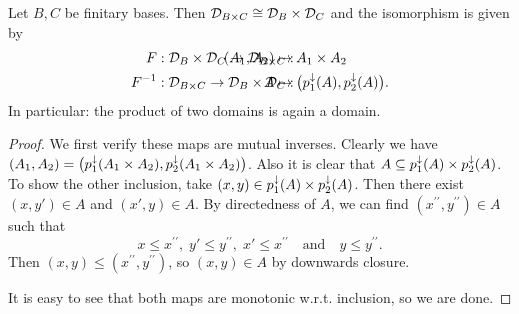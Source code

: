 \begin{lemma} \label{domainProductLemma}
Let $B,C$ be finitary bases. Then $\mathcal{D}_{B\times C} \cong \mathcal{D}_B\times\mathcal{D}_C$ and the isomorphism is given by
\begin{align*}
F&: \domain_B\times\domain_C \to \domain_{B\times C}: & \hspace{-6em} (A_1,A_2) &\mapsto A_1\times A_2 \\
F^{-1}&: \domain_{B\times C} \to \domain_B\times\domain_C: & \hspace{-6em} A&\mapsto \big(p_1^\imf(A), p_2^\imf(A)\big).
\end{align*}
In particular: the product of two domains is again a domain.
\end{lemma}
\begin{proof}
We first verify these maps are mutual inverses. Clearly we have $(A_1, A_2) = \big(p_1^\downarrow(A_1\times A_2), p_2^\downarrow(A_1\times A_2)\big)$. Also it is clear that $A \subseteq p_1^\downarrow(A)\times p_2^\downarrow(A)$. To show the other inclusion, take $(x,y) \in p_1^\downarrow(A)\times p_2^\downarrow(A)$. Then there exist $(x,y')\in A$ and $(x',y)\in A$. By directedness of $A$, we can find $(x^{\prime\prime}, y^{\prime\prime})\in A$ such that
\[ x \leq x^{\prime\prime},\; y' \leq y^{\prime\prime},\; x'\leq x^{\prime\prime} \quad\text{and}\quad y \leq y^{\prime\prime}. \]
Then $(x,y) \leq (x^{\prime\prime}, y^{\prime\prime})$, so $(x,y)\in A$ by downwards closure.

It is easy to see that both maps are monotonic w.r.t. inclusion, so we are done.
\end{proof}

